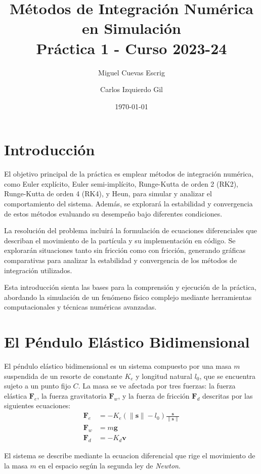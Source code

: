 \documentclass{article}
\title{Métodos de Integración Numérica en Simulación \\ \large{Práctica 1 - Curso 2023-24}}
\author{Miguel Cuevas Escrig \and Carlos Izquierdo Gil}
\date{\today}
\begin{document}
\maketitle
\tableofcontents
\section{Introducción}

El objetivo principal de la práctica es emplear métodos de integración numérica, como Euler explícito, Euler semi-implícito, Runge-Kutta de orden 2 (RK2), Runge-Kutta de orden 4 (RK4), y Heun, para simular y analizar el comportamiento del sistema. Además, se explorará la estabilidad y convergencia de estos métodos evaluando su desempeño bajo diferentes condiciones.

La resolución del problema incluirá la formulación de ecuaciones diferenciales que describan el movimiento de la partícula y su implementación en código. Se explorarán situaciones tanto sin fricción como con fricción, generando gráficas comparativas para analizar la estabilidad y convergencia de los métodos de integración utilizados.

Esta introducción sienta las bases para la comprensión y ejecución de la práctica, abordando la simulación de un fenómeno físico complejo mediante herramientas computacionales y técnicas numéricas avanzadas.

\section{El Péndulo Elástico Bidimensional}

El péndulo elástico bidimensional es un sistema compuesto por una masa $m$ suspendida de un resorte de constante $K_e$ y longitud natural $l_0$, que se encuentra sujeto a un punto fijo $C$. La masa se ve afectada por tres fuerzas: la fuerza elástica $\mathbf{F}_e$, la fuerza gravitatoria $\mathbf{F}_w$, y la fuerza de fricción $\mathbf{F}_d$ descritas por las siguientes ecuaciones:
\begin{align*}
    \mathbf{F}_e & = -K_e (\|\mathbf{s}\| - l_0) \frac{\mathbf{s}}{\|\mathbf{s}\|} \\
    \mathbf{F}_w & = m\mathbf{g}                                                   \\
    \mathbf{F}_d & = -K_d\mathbf{v}
\end{align*}

El sistema se describe mediante la ecuacion diferencial que rige el movimiento de la masa $m$ en el espacio según la segunda ley de \textit{Newton}.
\end{document}
